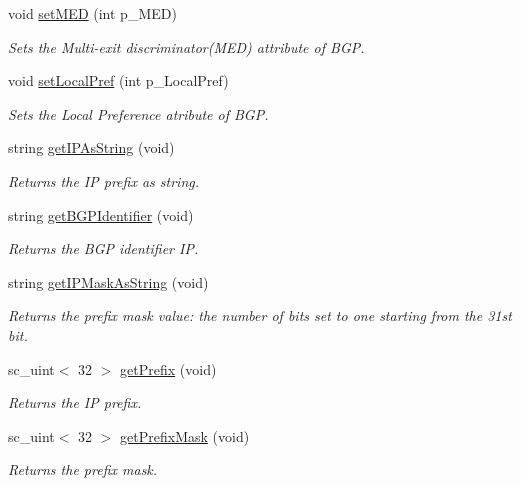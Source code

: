 \begin{DoxyCompactItemize}
\item 
void \hyperlink{classBGPSessionParameters_ab6f1e71374d250392eabe4571245137d}{set\-M\-E\-D} (int p\-\_\-\-M\-E\-D)
\begin{DoxyCompactList}\small\item\em Sets the Multi-\/exit discriminator(\-M\-E\-D) attribute of B\-G\-P. \end{DoxyCompactList}\item 
void \hyperlink{classBGPSessionParameters_a898ff54a5ddb05b8212fe8b1cdbb16be}{set\-Local\-Pref} (int p\-\_\-\-Local\-Pref)
\begin{DoxyCompactList}\small\item\em Sets the Local Preference atribute of B\-G\-P. \end{DoxyCompactList}\item 
string \hyperlink{classBGPSessionParameters_a4221d963d60974d8236164b29743aec8}{get\-I\-P\-As\-String} (void)
\begin{DoxyCompactList}\small\item\em Returns the I\-P prefix as string. \end{DoxyCompactList}\item 
string \hyperlink{classBGPSessionParameters_a5da0c2ccd227626e379db649965ee5f2}{get\-B\-G\-P\-Identifier} (void)
\begin{DoxyCompactList}\small\item\em Returns the B\-G\-P identifier I\-P. \end{DoxyCompactList}\item 
string \hyperlink{classBGPSessionParameters_a5e810c8d0bd6eff56233507adf6dabe7}{get\-I\-P\-Mask\-As\-String} (void)
\begin{DoxyCompactList}\small\item\em Returns the prefix mask value\-: the number of bits set to one starting from the 31st bit. \end{DoxyCompactList}\item 
sc\-\_\-uint$<$ 32 $>$ \hyperlink{classBGPSessionParameters_a32780ac488ad12575334f9b004426bc3}{get\-Prefix} (void)
\begin{DoxyCompactList}\small\item\em Returns the I\-P prefix. \end{DoxyCompactList}\item 
sc\-\_\-uint$<$ 32 $>$ \hyperlink{classBGPSessionParameters_afa843363c1ad8881e957c5a7a53004a9}{get\-Prefix\-Mask} (void)
\begin{DoxyCompactList}\small\item\em Returns the prefix mask. \end{DoxyCompactList}\item 

\end{DoxyCompactItemize}
